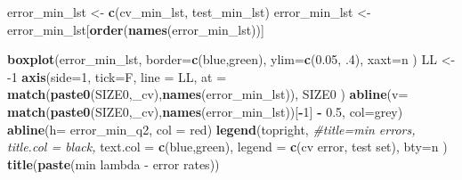 \documentclass[
]{book}
\newenvironment{Shaded}{\begin{snugshade}}{\end{snugshade}}
\newcommand{\CommentTok}[1]{\textcolor[rgb]{0.56,0.35,0.01}{\textit{#1}}}
\newcommand{\DataTypeTok}[1]{\textcolor[rgb]{0.13,0.29,0.53}{#1}}
\newcommand{\DecValTok}[1]{\textcolor[rgb]{0.00,0.00,0.81}{#1}}
\newcommand{\FloatTok}[1]{\textcolor[rgb]{0.00,0.00,0.81}{#1}}
\newcommand{\KeywordTok}[1]{\textcolor[rgb]{0.13,0.29,0.53}{\textbf{#1}}}
\newcommand{\NormalTok}[1]{#1}
\newcommand{\OperatorTok}[1]{\textcolor[rgb]{0.81,0.36,0.00}{\textbf{#1}}}
\newcommand{\StringTok}[1]{\textcolor[rgb]{0.31,0.60,0.02}{#1}}
\begin{document}
\begin{Shaded}
\begin{Highlighting}[]
\NormalTok{error\_min\_lst <{-}}\StringTok{ }\KeywordTok{c}\NormalTok{(cv\_min\_lst, test\_min\_lst)}
\NormalTok{error\_min\_lst <{-}}\StringTok{ }\NormalTok{error\_min\_lst[}\KeywordTok{order}\NormalTok{(}\KeywordTok{names}\NormalTok{(error\_min\_lst))]}

\KeywordTok{boxplot}\NormalTok{(error\_min\_lst, }
  \DataTypeTok{border=}\KeywordTok{c}\NormalTok{(}\StringTok{\textquotesingle{}blue\textquotesingle{}}\NormalTok{,}\StringTok{\textquotesingle{}green\textquotesingle{}}\NormalTok{), }
  \DataTypeTok{ylim=}\KeywordTok{c}\NormalTok{(}\FloatTok{0.05}\NormalTok{, }\FloatTok{.4}\NormalTok{),}
  \DataTypeTok{xaxt=}\StringTok{\textquotesingle{}n\textquotesingle{}}
\NormalTok{)}
\NormalTok{LL <{-}}\StringTok{ }\DecValTok{{-}1}
\KeywordTok{axis}\NormalTok{(}\DataTypeTok{side=}\DecValTok{1}\NormalTok{, }\DataTypeTok{tick=}\NormalTok{F, }\DataTypeTok{line =}\NormalTok{ LL,}
  \DataTypeTok{at =} \KeywordTok{match}\NormalTok{(}\KeywordTok{paste0}\NormalTok{(SIZE0,}\StringTok{\textquotesingle{}\_cv\textquotesingle{}}\NormalTok{),}\KeywordTok{names}\NormalTok{(error\_min\_lst)), }
\NormalTok{  SIZE0}
\NormalTok{ )}
\KeywordTok{abline}\NormalTok{(}\DataTypeTok{v=} \KeywordTok{match}\NormalTok{(}\KeywordTok{paste0}\NormalTok{(SIZE0,}\StringTok{\textquotesingle{}\_cv\textquotesingle{}}\NormalTok{),}\KeywordTok{names}\NormalTok{(error\_min\_lst))[}\OperatorTok{{-}}\DecValTok{1}\NormalTok{] }\OperatorTok{{-}}\StringTok{ }\FloatTok{0.5}\NormalTok{, }\DataTypeTok{col=}\StringTok{\textquotesingle{}grey\textquotesingle{}}\NormalTok{)}
\KeywordTok{abline}\NormalTok{(}\DataTypeTok{h=}\NormalTok{ error\_min\_q2, }\DataTypeTok{col =} \StringTok{\textquotesingle{}red\textquotesingle{}}\NormalTok{)}
\KeywordTok{legend}\NormalTok{(}\StringTok{\textquotesingle{}topright\textquotesingle{}}\NormalTok{, }
   \CommentTok{\#title=\textquotesingle{}min errors\textquotesingle{}, title.col = \textquotesingle{}black\textquotesingle{},}
   \DataTypeTok{text.col =} \KeywordTok{c}\NormalTok{(}\StringTok{\textquotesingle{}blue\textquotesingle{}}\NormalTok{,}\StringTok{\textquotesingle{}green\textquotesingle{}}\NormalTok{),}
   \DataTypeTok{legend =} \KeywordTok{c}\NormalTok{(}\StringTok{\textquotesingle{}cv error\textquotesingle{}}\NormalTok{, }\StringTok{\textquotesingle{}test set\textquotesingle{}}\NormalTok{),}
   \DataTypeTok{bty=}\StringTok{\textquotesingle{}n\textquotesingle{}}
\NormalTok{ )}
\KeywordTok{title}\NormalTok{(}\KeywordTok{paste}\NormalTok{(}\StringTok{\textquotesingle{}min lambda {-} error rates\textquotesingle{}}\NormalTok{))}


\end{Highlighting}
\end{Shaded}
\end{document}
